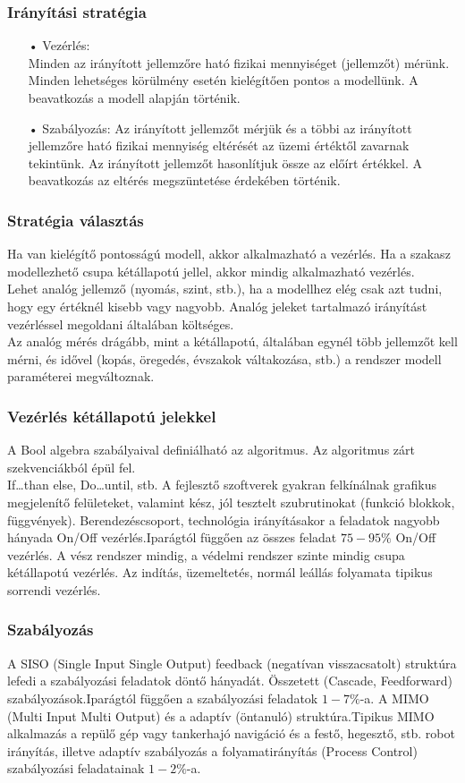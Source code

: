 \documentclass[11pt,a4paper]{article}
\begin{document}
\subsubsection{Irányítási stratégia}
\begin{enumerate}
	\item[•]Vezérlés:\\
	Minden az irányított jellemzőre ható fizikai mennyiséget (jellemzőt) mérünk. Minden lehetséges körülmény esetén kielégítően pontos a modellünk. A beavatkozás a modell alapján történik.
	\item[•]Szabályozás: 
	Az irányított jellemzőt mérjük és a többi az irányított jellemzőre ható fizikai mennyiség eltérését az üzemi értéktől zavarnak tekintünk. Az irányított jellemzőt hasonlítjuk össze az előírt értékkel. A beavatkozás az eltérés megszüntetése érdekében történik. 
\end{enumerate}
\subsubsection{Stratégia választás}
Ha van kielégítő pontosságú modell, akkor alkalmazható a vezérlés.
Ha a szakasz modellezhető csupa kétállapotú jellel, akkor mindig alkalmazható vezérlés.\\Lehet analóg jellemző (nyomás, szint, stb.), ha a modellhez elég csak azt tudni, hogy egy értéknél kisebb vagy nagyobb.
Analóg jeleket tartalmazó irányítást vezérléssel megoldani általában költséges.\\Az analóg  mérés drágább, mint a kétállapotú, általában egynél több jellemzőt kell mérni, és idővel (kopás, öregedés, évszakok váltakozása, stb.) a rendszer modell paraméterei megváltoznak.
\subsubsection{Vezérlés kétállapotú jelekkel}
A Bool algebra szabályaival definiálható az algoritmus.
Az algoritmus zárt szekvenciákból épül fel.\\If…than   else, Do…until,  stb. A fejlesztő szoftverek gyakran felkínálnak grafikus megjelenítő felületeket, valamint kész, jól tesztelt szubrutinokat (funkció blokkok, függvények).
Berendezéscsoport, technológia irányításakor a feladatok nagyobb hányada On/Off vezérlés.Iparágtól függően az összes feladat $75-95\%$ On/Off vezérlés. A vész rendszer mindig, a védelmi rendszer szinte mindig csupa kétállapotú vezérlés. Az indítás, üzemeltetés, normál leállás folyamata tipikus sorrendi vezérlés.
\subsubsection{Szabályozás}
A SISO (Single Input Single Output) feedback (negatívan visszacsatolt) struktúra lefedi a szabályozási feladatok döntő hányadát.
Összetett (Cascade, Feedforward) szabályozások.Iparágtól függően a szabályozási feladatok $1-7\%$-a.
A MIMO (Multi Input Multi Output) és a adaptív (öntanuló) struktúra.Tipikus MIMO alkalmazás  a repülő gép vagy tankerhajó navigáció és a festő, hegesztő, stb. robot irányítás, illetve adaptív szabályozás a folyamatirányítás (Process Control) szabályozási feladatainak $1-2\%$-a.
\end{document}
